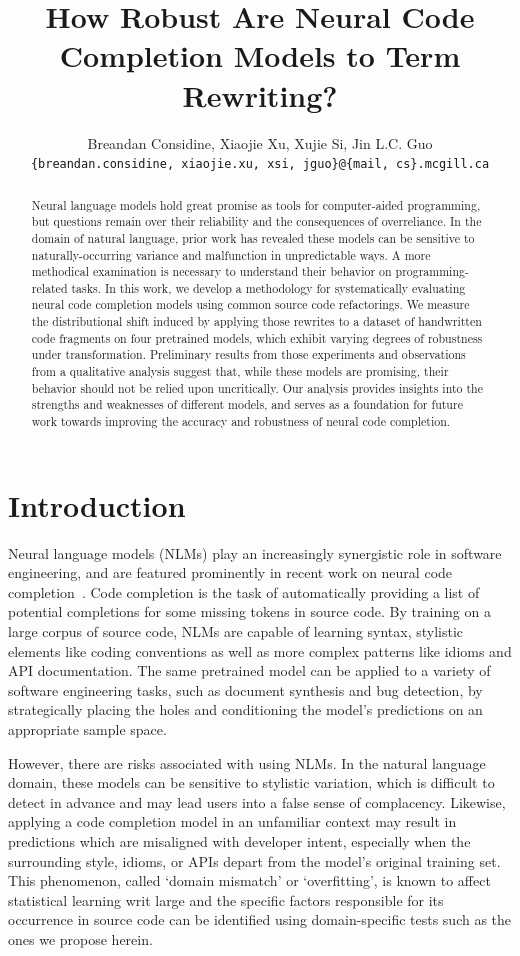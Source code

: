 \documentclass[usenames,dvipsnames]{article} %
\title{How Robust Are Neural Code Completion Models to Term Rewriting?}
\author{Breandan Considine, Xiaojie Xu, Xujie Si, Jin L.C. Guo\\
\texttt{\{breandan.considine, xiaojie.xu, xsi, jguo\}@\{mail, cs\}.mcgill.ca}\\
}
\begin{document}
  \maketitle

  \begin{abstract}
    Neural language models hold great promise as tools for computer-aided programming, but questions remain over their reliability and the consequences of overreliance. In the domain of natural language, prior work has revealed these models can be sensitive to naturally-occurring variance and malfunction in unpredictable ways. A more methodical examination is necessary to understand their behavior on programming-related tasks. In this work, we develop a methodology for systematically evaluating neural code completion models using common source code refactorings. We measure the distributional shift induced by applying those rewrites to a dataset of handwritten code fragments on four pretrained models, which exhibit varying degrees of robustness under transformation. Preliminary results from those experiments and observations from a qualitative analysis suggest that, while these models are promising, their behavior should not be relied upon uncritically. Our analysis provides insights into the strengths and weaknesses of different models, and serves as a foundation for future work towards improving the accuracy and robustness of neural code completion.
  \end{abstract}

  \section{Introduction}\label{sec:introduction}

  Neural language models (NLMs) play an increasingly synergistic role in software engineering, and are featured prominently in recent work on neural code completion~\citep{chen2021evaluating}. Code completion is the task of automatically providing a list of potential completions for some missing tokens in source code. By training on a large corpus of source code, NLMs are capable of learning syntax, stylistic elements like coding conventions as well as more complex patterns like idioms and API documentation. The same pretrained model can be applied to a variety of software engineering tasks, such as document synthesis and bug detection, by strategically placing the holes and conditioning the model's predictions on an appropriate sample space.

  However, there are risks associated with using NLMs. In the natural language domain, these models can be sensitive to stylistic variation, which is difficult to detect in advance and may lead users into a false sense of complacency. Likewise, applying a code completion model in an unfamiliar context may result in predictions which are misaligned with developer intent, especially when the surrounding style, idioms, or APIs depart from the model's original training set. This phenomenon, called `domain mismatch' or `overfitting', is known to affect statistical learning writ large and the specific factors responsible for its occurrence in source code can be identified using domain-specific tests such as the ones we propose herein.
\end{document}
